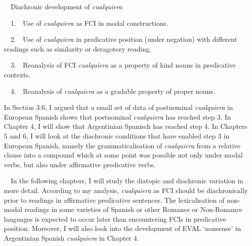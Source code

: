 \begin{styleStandard}
\ \ Diachronic development of \textit{cualquiera}
\end{styleStandard}

\begin{styleStandard}
\ \ 1.\ \ Use of \textit{cualquiera} as FCI in modal constructions.
\end{styleStandard}

\begin{styleStandard}
\ \ 2.\ \ Use of \textit{cualquiera} in predicative position (under negation) with different readings such as similarity or deragotory reading.
\end{styleStandard}

\begin{styleStandard}
\ \ 3.\ \ Reanalysis of FCI \textit{cualquiera} as a property of kind nouns in predicative contexts.
\end{styleStandard}

\begin{styleStandard}
\ \ 4.\ \ Reanalysis of \textit{cualquiera} as a gradable property\textit{ }of proper nouns.
\end{styleStandard}

\begin{styleStandard}
In Section 3.6, I argued that a small set of data of postnominal \textit{cualquiera} in European Spanish shows that postnominal \textit{cualquiera} has reached step 3. In Chapter 4, I will show that Argentinian Spanisch has reached step 4. In Chapters 5 and 6, I will look at the diachronic conditions that have enabled step 3 in European Spanish, namely the grammaticalisation of \textit{cualquiera} from a relative clause into a compound which at some point was possible not only under modal verbs, but also under affirmative predicative verbs.
\end{styleStandard}

\begin{styleStandard}
\ \ In the following chapters, I will study the diatopic and diachronic variation in more detail. According to my analysis, \textit{cualquiera} as FCI should be diachronically prior to readings in affirmative predicative sentences. The lexicalisation of non-modal readings in some varieties of Spanish or other Romance or Non-Romance languages is expected to occur later than encountering FCIs in predicative position. Moreover, I will also look into the development of EVAL ‘nonsense’ in Argentinian Spanish \textit{cualquiera} in Chapter 4.
\end{styleStandard}

